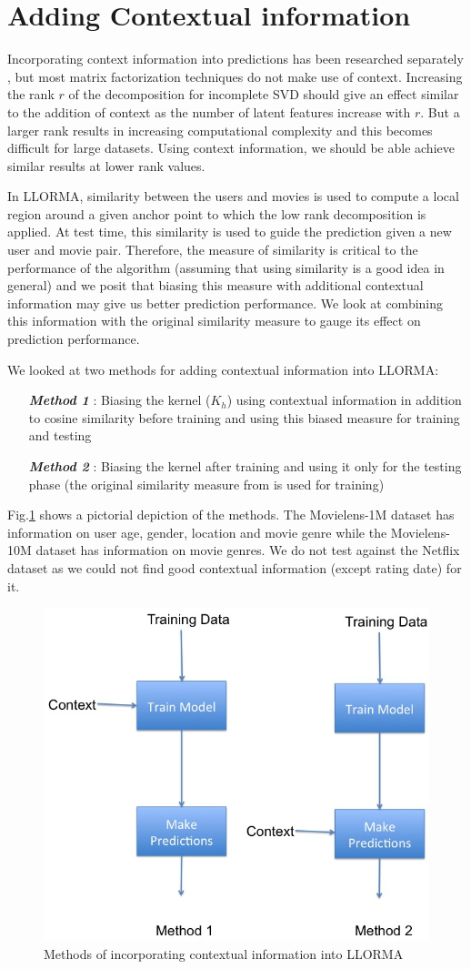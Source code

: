\documentclass[10 pt,table]{article}  %
\newcommand{\figref}[1]{Fig.\ref{#1}}
\begin{document}
\section{Adding Contextual information}
Incorporating context information into predictions has been researched separately \cite{adomavicius2005incorporating}\cite{adomavicius2011context}, but most matrix factorization techniques do not make use of context. Increasing the rank $r$ of the decomposition for incomplete SVD should give an effect similar to the addition of context as the number of latent features increase with $r$. But a larger rank results in increasing computational complexity and this becomes difficult for large datasets. Using context information, we should be able achieve similar results at lower rank values.

In LLORMA, similarity between the users and movies is used to compute a local region around a given anchor point to which the low rank decomposition is applied. At test time, this similarity is used to guide the prediction given a new user and movie pair. Therefore, the measure of similarity is critical to the performance of the algorithm (assuming that using similarity is a good idea in general) and we posit that biasing this measure with additional contextual information may give us better prediction performance. We look at combining this information with the original similarity measure to gauge its effect on prediction performance. 

We looked at two methods for adding contextual information into LLORMA:
\begin{itemize}
\item[\textbf{\emph{Method 1}}]: Biasing the kernel ($K_h$) using contextual information in addition to cosine similarity before training and using this biased measure for training and testing
\item[\textbf{\emph{Method 2}}]: Biasing the kernel after training and using it only for the testing phase (the original similarity measure from \cite{lee2013local} is used for training)
\end{itemize}
\figref{fig:simMethods} shows a pictorial depiction of the methods. The Movielens-1M dataset has information on user age, gender, location and movie genre while the Movielens-10M dataset has information on movie genres. We do not test against the Netflix dataset as we could not find good contextual information (except rating date) for it.

\begin{figure}[h!]
\centering
\includegraphics[width=0.4\columnwidth]{simMethods}
\caption{\small Methods of incorporating contextual information into LLORMA}
\label{fig:simMethods} \vspace{-1mm}
\end{figure} 
\end{document}
